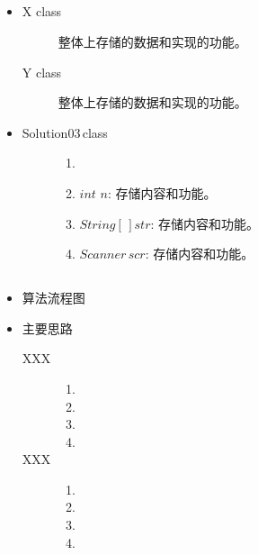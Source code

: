 \documentclass{article}
\begin{document}
\subsection{}
\begin{itemize}
	\item{}
	\begin{description}
		\item[X\,\,class]\kaishu 整体上存储的数据和实现的功能。
		\item[Y\,\,class]\kaishu 整体上存储的数据和实现的功能。
	\end{description}
	\item{}
	\begin{description}
		\item[Solution03\,class]
		\begin{enumerate}
			\item[] \hspace{2pt}
			\item \kaishu $int\,\,n:$\,存储内容和功能。
			\item \kaishu $String[\,]str:$\,存储内容和功能。
			\item \kaishu $Scanner\,scr:$\,存储内容和功能。
		\end{enumerate}
	\end{description}
\end{itemize}


\subsection{}
\begin{itemize}
	\item \kaishu 算法流程图
	\begin{center}
	\end{center}
	\item \kaishu 主要思路
	\begin{description}
		\item[\kaishu XXX]
			\begin{enumerate}
		\item[]\hspace{2pt}
				\item\kaishu
				\item\kaishu
				\item\kaishu
			\end{enumerate}
		\item[\kaishu XXX]
			\begin{enumerate}
				\item[]\hspace{2pt}
				\item\kaishu
				\item\kaishu
				\item\kaishu
			\end{enumerate}
	\end{description}
\end{itemize}
\end{document}

